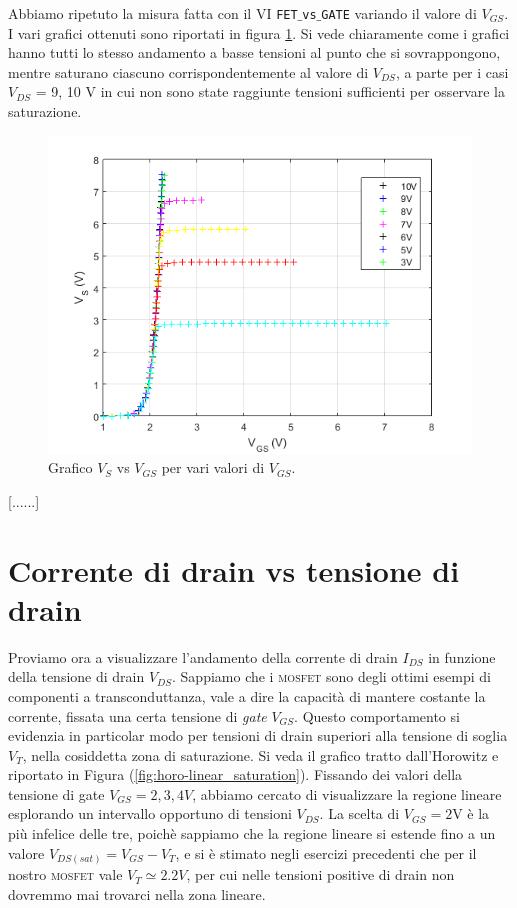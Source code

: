 \documentclass[journal, a4paper]{IEEEtran}
\begin{document}
Abbiamo ripetuto la misura fatta con il VI \texttt{FET$\_$vs$\_$GATE} variando il valore di $V_{GS}$. I vari grafici ottenuti sono riportati in figura \ref{fig:all}. Si vede chiaramente come i grafici hanno tutti lo stesso andamento a basse tensioni al punto che si sovrappongono, mentre saturano ciascuno corrispondentemente al valore di $V_{DS}$, a parte per i casi $V_{DS}$ = 9, 10 V in cui non sono state raggiunte tensioni sufficienti per osservare la saturazione.\\

\begin{figure}[htp]
\centering
\includegraphics[scale=.5]{all}
\caption{Grafico $V_S$ vs $V_{GS}$ per vari valori di $V_{GS}$.}
\label{fig:all}
\end{figure}

[......]\\

\section{Corrente di drain vs tensione di drain}
Proviamo ora a visualizzare l'andamento della corrente di drain $I_{DS}$ in funzione della tensione di drain $V_{DS}$. Sappiamo che i \textsc{mosfet} sono degli ottimi esempi di componenti a transconduttanza, vale a dire la capacità di mantere costante la corrente, fissata una certa tensione di \textit{gate} $V_{GS}$. Questo comportamento si evidenzia in particolar modo per tensioni di drain superiori alla tensione di soglia $V_T$, nella cosiddetta zona di saturazione. Si veda il grafico tratto dall'Horowitz e riportato in Figura (\ref{fig:horo-linear_saturation}). Fissando dei valori della tensione di gate $V_{GS} = 2, 3, 4 \si{V}$, abbiamo cercato di visualizzare la regione lineare esplorando un intervallo opportuno di tensioni $V_{DS}$. La scelta di $V_{GS} = 2$V è la più infelice delle tre, poichè sappiamo che la regione lineare si estende fino a un valore $V_{DS(sat)} = V_{GS} - V_T$, e si è stimato negli esercizi precedenti che per il nostro \textsc{mosfet} vale $V_T \simeq 2.2 V$, per cui nelle tensioni positive di drain non dovremmo mai trovarci nella zona lineare.\\ 
\end{document}
